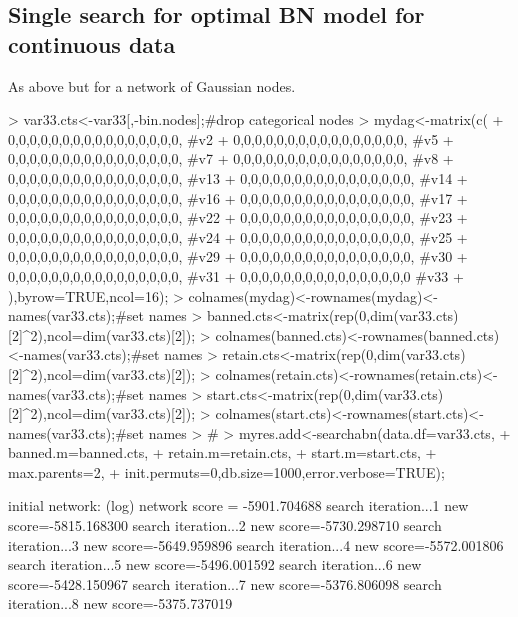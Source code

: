 \documentclass[nojss]{jss}
\begin{document}
\subsection{Single search for optimal BN model for continuous data} \label{sec4a}
As above but for a network of Gaussian nodes.
\begin{Schunk}
\begin{Sinput}
> var33.cts<-var33[,-bin.nodes];#drop categorical nodes
> mydag<-matrix(c(
+                  0,0,0,0,0,0,0,0,0,0,0,0,0,0,0,0, #v2
+                  0,0,0,0,0,0,0,0,0,0,0,0,0,0,0,0, #v5  
+                  0,0,0,0,0,0,0,0,0,0,0,0,0,0,0,0, #v7  
+                  0,0,0,0,0,0,0,0,0,0,0,0,0,0,0,0, #v8 
+                  0,0,0,0,0,0,0,0,0,0,0,0,0,0,0,0, #v13  
+                  0,0,0,0,0,0,0,0,0,0,0,0,0,0,0,0, #v14  
+                  0,0,0,0,0,0,0,0,0,0,0,0,0,0,0,0, #v16  
+                  0,0,0,0,0,0,0,0,0,0,0,0,0,0,0,0, #v17  
+                  0,0,0,0,0,0,0,0,0,0,0,0,0,0,0,0, #v22 
+                  0,0,0,0,0,0,0,0,0,0,0,0,0,0,0,0, #v23
+                  0,0,0,0,0,0,0,0,0,0,0,0,0,0,0,0, #v24 
+                  0,0,0,0,0,0,0,0,0,0,0,0,0,0,0,0, #v25 
+                  0,0,0,0,0,0,0,0,0,0,0,0,0,0,0,0, #v29 
+                  0,0,0,0,0,0,0,0,0,0,0,0,0,0,0,0, #v30 
+                  0,0,0,0,0,0,0,0,0,0,0,0,0,0,0,0, #v31 
+                  0,0,0,0,0,0,0,0,0,0,0,0,0,0,0,0  #v33 
+               ),byrow=TRUE,ncol=16); 
> colnames(mydag)<-rownames(mydag)<-names(var33.cts);#set names
> banned.cts<-matrix(rep(0,dim(var33.cts)[2]^2),ncol=dim(var33.cts)[2]);
> colnames(banned.cts)<-rownames(banned.cts)<-names(var33.cts);#set names
> retain.cts<-matrix(rep(0,dim(var33.cts)[2]^2),ncol=dim(var33.cts)[2]);
> colnames(retain.cts)<-rownames(retain.cts)<-names(var33.cts);#set names
> start.cts<-matrix(rep(0,dim(var33.cts)[2]^2),ncol=dim(var33.cts)[2]);
> colnames(start.cts)<-rownames(start.cts)<-names(var33.cts);#set names
> #
> myres.add<-searchabn(data.df=var33.cts,
+                  banned.m=banned.cts,
+                  retain.m=retain.cts,
+                  start.m=start.cts,
+                  max.parents=2, 
+                  init.permuts=0,db.size=1000,error.verbose=TRUE);
\end{Sinput}
\begin{Soutput}
initial network: (log) network score = -5901.704688
search iteration...1 new score=-5815.168300
search iteration...2 new score=-5730.298710
search iteration...3 new score=-5649.959896
search iteration...4 new score=-5572.001806
search iteration...5 new score=-5496.001592
search iteration...6 new score=-5428.150967
search iteration...7 new score=-5376.806098
search iteration...8 new score=-5375.737019
\end{Soutput}
\end{Schunk}
\end{document}
